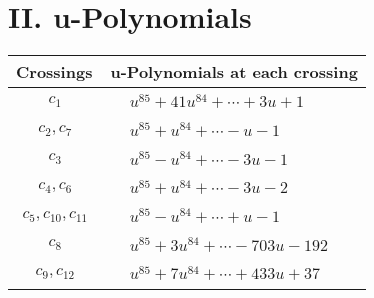 \documentclass[1p]{elsarticle_modified}
\theoremstyle{definition}
\begin{document}
\newpage\renewcommand{\arraystretch}{1}
\centering \section*{ II. u-Polynomials}
\begin{tabular}{m{50pt}|m{274pt}}
Crossings & \hspace{64pt}u-Polynomials at each crossing \\
\hline $$\begin{aligned}c_{1}\end{aligned}$$&$\begin{aligned}
&u^{85}+41 u^{84}+\cdots+3 u+1
\end{aligned}$\\
\hline $$\begin{aligned}c_{2},c_{7}\end{aligned}$$&$\begin{aligned}
&u^{85}+u^{84}+\cdots- u-1
\end{aligned}$\\
\hline $$\begin{aligned}c_{3}\end{aligned}$$&$\begin{aligned}
&u^{85}- u^{84}+\cdots-3 u-1
\end{aligned}$\\
\hline $$\begin{aligned}c_{4},c_{6}\end{aligned}$$&$\begin{aligned}
&u^{85}+u^{84}+\cdots-3 u-2
\end{aligned}$\\
\hline $$\begin{aligned}c_{5},c_{10},c_{11}\end{aligned}$$&$\begin{aligned}
&u^{85}- u^{84}+\cdots+u-1
\end{aligned}$\\
\hline $$\begin{aligned}c_{8}\end{aligned}$$&$\begin{aligned}
&u^{85}+3 u^{84}+\cdots-703 u-192
\end{aligned}$\\
\hline $$\begin{aligned}c_{9},c_{12}\end{aligned}$$&$\begin{aligned}
&u^{85}+7 u^{84}+\cdots+433 u+37
\end{aligned}$\\
\hline
\end{tabular}\newpage\renewcommand{\arraystretch}{1}
\end{document}
